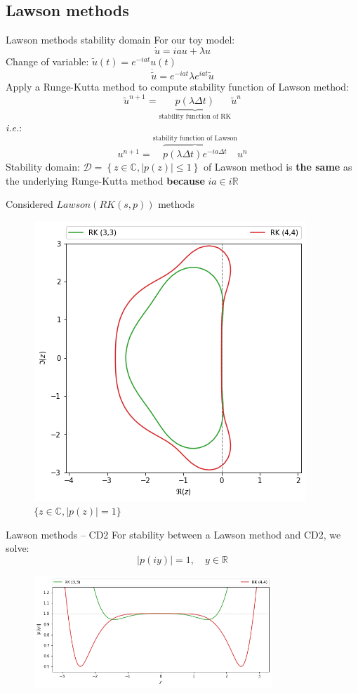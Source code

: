 \documentclass{beamer}
\begin{document}
\subsection{Lawson methods}
\begin{frame}{Lawson methods stability domain}
  For our toy model:
  $$
    \dot{u} = iau + \lambda u
  $$
  Change of variable: $\tilde{u}(t) = e^{-iat}u(t)$
  $$
    \dot{\tilde{u}} = e^{-iat}\lambda e^{iat}\tilde{u}
  $$
  Apply a Runge-Kutta method to compute stability function of Lawson method:
  $$
    \tilde{u}^{n+1} = \underbrace{p(\lambda\Delta t)}_{\text{stability function of RK}}\tilde{u}^n
  $$
  \emph{i.e.}:
  $$
    u^{n+1} = \overbrace{p(\lambda\Delta t)e^{-ia\Delta t}}^{\text{stability function of Lawson}}u^n
  $$
  Stability domain: $\mathcal{D}=\left\{z\in\mathbb{C},|p(z)|\leq 1\right\}$ of Lawson method is \textbf{the same} as the underlying Runge-Kutta method \textbf{because} $ia\in i\mathbb{R}$
\end{frame}
\begin{frame}{Considered $Lawson(RK(s,p))$ methods}
  \begin{figure}\centering
    \includegraphics[height=0.75\textheight]{img/rk_sd.png}
    \caption{$\{z\in\mathbb{C},|p(z)|=1\}$}
  \end{figure}
\end{frame}
\begin{frame}{Lawson methods -- CD2}
  For stability between a Lawson method and CD2, we solve:
  $$
    |p(iy)| = 1,\quad y\in\mathbb{R}
  $$
  \begin{figure}\centering
    \includegraphics[width=0.8\textwidth]{img/yaxis.png}
  \end{figure}
\end{frame}
\end{document}
